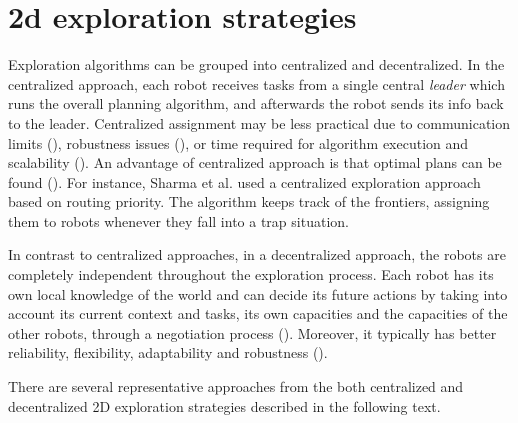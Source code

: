 \section{2d exploration strategies}
Exploration algorithms can be grouped into centralized and decentralized. In the  centralized approach, each robot receives tasks from a single central \emph{leader} which runs the overall planning algorithm, and afterwards the robot sends its info back to the leader. Centralized assignment may be less practical due to communication limits (\cite{Dias2000}), robustness issues (\cite{Dias2006}), or time required for algorithm execution and scalability (\cite{Julia2012}). An advantage of centralized approach is that optimal plans can be found (\cite{Yan2011}). For instance, Sharma et al. \cite{SharmaHonc2016} used a centralized exploration approach based on routing priority. The algorithm keeps track of the frontiers, assigning them to robots  whenever they fall into a trap situation.

In contrast to centralized approaches, in a decentralized approach, the robots are completely independent throughout the exploration process. Each robot has its own local knowledge of the world and can decide its future actions by taking into account its current context and tasks, its own capacities and the capacities of the other robots, through a negotiation process (\cite{Yan2013}). Moreover, it typically has better reliability, flexibility, adaptability and robustness (\cite{Zlot2002}). 
 
There are several representative approaches from the both centralized and decentralized 2D exploration strategies described in the following text. 



